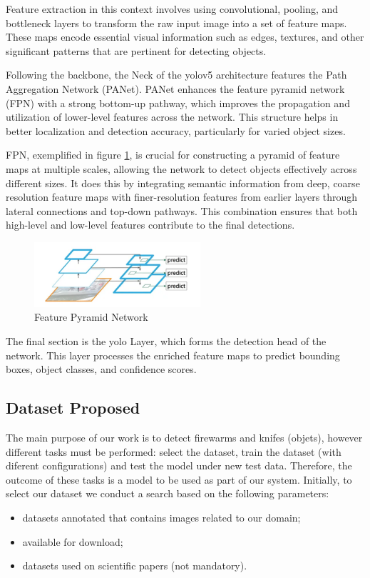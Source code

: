 Feature extraction in this context involves using convolutional, pooling, and bottleneck layers to 
transform the raw input image into a set of feature maps. These maps encode essential visual information 
such as edges, textures, and other significant patterns that are pertinent for detecting objects.

Following the backbone, the Neck of the \ac{yolo}v5 architecture features the Path Aggregation Network (PANet). PANet 
enhances the feature pyramid network (FPN) with a strong bottom-up pathway, which improves the propagation and 
utilization of lower-level features across the network. This structure helps in better localization and detection 
accuracy, particularly for varied object sizes.

FPN, exemplified in figure \ref{fig:fpn}, is crucial for constructing a pyramid of feature maps at multiple scales, 
allowing the network to detect 
objects effectively across different sizes. It does this by integrating semantic information from deep, coarse 
resolution feature maps with finer-resolution features from earlier layers through lateral connections and top-down 
pathways. This combination ensures that both high-level and low-level features contribute to the final detections.

\begin{figure}[h]
    \centering 
    \includegraphics[width=0.55\textwidth]{figs/fpn.png} 
    \caption{Feature Pyramid Network}
    \label{fig:fpn}
\end{figure}

The final section is the \ac{yolo} Layer, which forms the detection head of the network. This layer processes the 
enriched feature maps to predict bounding boxes, object classes, and confidence scores.

\subsection{Dataset Proposed} 
The main purpose of our work is to detect firewarms and knifes (objets), however different tasks must be performed: 
select the dataset, train the dataset (with diferent configurations) and test the model under new test data. Therefore, 
the outcome of these tasks is a model to be used as part of our system.
Initially, to select our dataset we conduct a search based on the following parameters:
\begin{itemize}
    \item datasets annotated that contains images related to our domain;
    \item available for download;
    \item datasets used on scientific papers (not mandatory).
\end{itemize}

